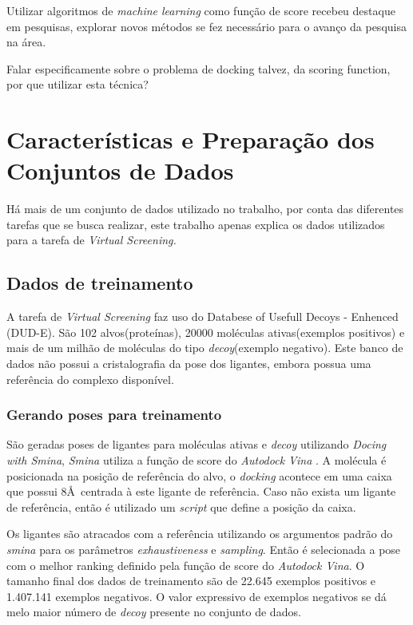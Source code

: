 \documentclass[utf8]{frontiersSCNS} %
\begin{document}
Utilizar algoritmos de \textit{machine learning} como função de score recebeu destaque em pesquisas, explorar novos métodos se fez necessário para o avanço da pesquisa na área. 

Falar especificamente sobre o problema de docking talvez, da scoring function, por que utilizar esta técnica?



\section{Características e Preparação dos Conjuntos de Dados} %
Há mais de um conjunto de dados utilizado no trabalho, por conta das diferentes tarefas que se busca realizar, este trabalho apenas explica os dados utilizados para a tarefa de \textit{Virtual Screening.}

\subsection{Dados de treinamento}

A tarefa de \textit{Virtual Screening} faz uso do Databese of Usefull Decoys - Enhenced (DUD-E)\cite{Mysinger2012DUDE}. São 102 alvos(proteínas), 20000 moléculas ativas(exemplos positivos) e mais de um milhão de moléculas do tipo \textit{decoy}(exemplo negativo). Este banco de dados não possui a cristalografia da pose dos ligantes, embora possua uma referência do complexo disponível.

\subsubsection{Gerando poses para treinamento}

São geradas poses de ligantes para moléculas ativas e \textit{decoy} utilizando \textit{Docing with Smina}, \textit{Smina} utiliza a função de score do \textit{Autodock Vina }\cite{smina}. A molécula é posicionada na posição de referência do alvo, o \textit{docking} acontece em uma caixa que possui 8\AA \  centrada à este ligante de referência. Caso não exista um ligante de referência, então é utilizado um \textit{script} que define a posição da caixa.

Os ligantes são atracados com a referência utilizando os argumentos padrão do \textit{smina} para os parâmetros \textit{exhaustiveness} e \textit{sampling}. Então é selecionada a pose com o melhor ranking definido pela função de score do \textit{Autodock Vina}. O tamanho final dos dados de treinamento são de 22.645 exemplos positivos e 1.407.141 exemplos negativos. O valor expressivo de exemplos negativos se dá melo maior número de \textit{decoy} presente no conjunto de dados. 
\end{document}
